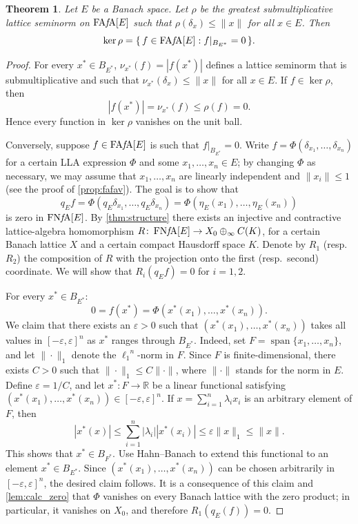\documentclass{memo-l}
\newtheorem{thm}[theorem]{Theorem}
\theoremstyle{definition}
\theoremstyle{remark}
\numberwithin{section}{chapter}
\numberwithin{equation}{chapter}
\newcommand\R{\ensuremath{\mathbb{R}}}
\newcommand{\el}[1]{\ensuremath{\ell_{#1}}}
\newcommand{\FAFAv}[1]{\operatorname{FA{\it f}\!A}[#1]}
\newcommand{\FNFA}[1]{\operatorname{FN{\it f}\!A}[#1]}
\DeclareMathOperator{\barespn}{span}
\begin{document}
\begin{thm}\label{thm:kernel}
    Let $E$ be a Banach space. Let $\rho $ be the greatest
    submultiplicative lattice seminorm on $\FAFAv E$ such that $\rho
    (\delta _x)\le \|x\|$ for all $x \in E$. Then
    \[
    \ker \rho =\{\, f\in \FAFAv E : f|_{B_{E^{*}}}=0 \, \}.
    \]
\end{thm}
\begin{proof}
    For every $x^{*} \in B_{E^{*}}$,
    $\nu _{x^{*}}(f)=|f(x^{*})|$ defines a lattice seminorm that is
    submultiplicative and such that $\nu _{x^{*}}(\delta _x)\le \|x\|$ for all
    $x \in E$. If $f \in \ker \rho $, then
    \[
        |f(x^{*})|=\nu _{x^{*}}(f)\le \rho (f)=0.
    \]
    Hence every function in $\ker \rho $ vanishes on the unit ball.

    Conversely, suppose $f \in \FAFAv E$ is such that $f|_{B_{E^{*}}}=0$.
    Write $f=\Phi (\delta  _{x_1},\ldots ,\delta _{x_n})$ for a
    certain LLA expression $\Phi $ and some $x_1,\ldots ,x_n \in E$;
    by changing $\Phi $ as necessary, we may assume that $x_1,\ldots
    ,x_n$ are linearly independent and $\|x_i\|\le 1$ (see the proof
    of \cref{prop:fafav}). The goal is to show that
    \[
    q_Ef=\Phi (q_E \delta _{x_1},\ldots ,q_E \delta _{x_n})=\Phi (\eta
    _E(x_1),\ldots ,\eta _E(x_n))
    \]
    is zero in $\FNFA E$. By \cref{thm:structure} there exists an injective and
    contractive lattice-algebra homomorphism $R\colon \FNFA E\to
    X_0\oplus_\infty C(K)$, for a certain Banach lattice $X$ and
    a certain compact Hausdorff space $K$. Denote by $R_1$ (resp.\ $R_2$) the composition of $R$ with
    the projection onto the first (resp.\ second) coordinate. We will
    show that $R_i(q_Ef)=0$ for $i=1,2$.


    For every $x^{*}\in B_{E^{*}}$:
    \[
    0=f(x^{*})=\Phi (x^{*}(x_1),\ldots ,x^{*}(x_n)).
    \]
    We claim that there exists an $\varepsilon >0$ such that $(x^{*}(x_1),\ldots ,x^{*}(x_n))$ takes all values in
    $[-\varepsilon ,\varepsilon ]^{n}$ as $x^{*}$ ranges through
    $B_{E^{*}}$. Indeed, set $F=\barespn\{x_1,\ldots ,x_n\}$, and let
    $\|{\cdot }\|_1$ denote the $\el 1^{n}$-norm in $F$. Since $F$ is
    finite-dimensional, there exists $C>0$ such that $\|{\cdot
    }\|_1\le C\|{\cdot }\|$, where $\|{\cdot }\|$ stands for the
    norm in $E$. Define $\varepsilon =1/C$, and let $x^{*}\colon F\to
    \R$ be a linear functional satisfying $(x^{*}(x_1),\ldots
    ,x^{*}(x_n))\in [-\varepsilon ,\varepsilon ]^{n}$. If
    $x=\sum_{i=1}^{n}\lambda _i x_i$ is an arbitrary element of $F$,
    then
    \[
    |x^{*}(x)|\le \sum_{i=1}^{n}|\lambda _i| |x^{*}(x_i)|\le
    \varepsilon \|x\|_1\le \|x\|.
    \]
    This shows that $x^{*}\in B_{F^{*}}$. Use Hahn--Banach to extend
    this functional to an element $x^{*}\in B_{E^{*}}$. Since $(x^{*}(x_1),\ldots
    ,x^{*}(x_n))$ can be chosen arbitrarily in $[-\varepsilon
    ,\varepsilon ]^n$, the desired claim follows.
    It is a consequence of this claim and \cref{lem:calc_zero} that $\Phi $
    vanishes on every Banach lattice with the zero product; in
    particular, it vanishes on $X_0$, and therefore $R_1(q_E(f))=0$.


\end{proof}
\end{document}
